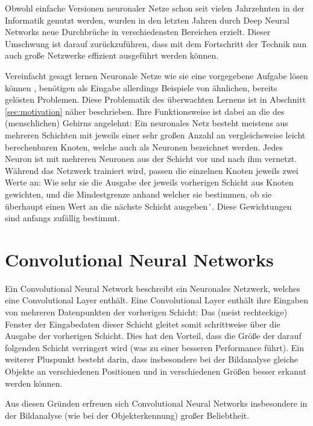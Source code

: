 Obwohl einfache Versionen neuronaler Netze schon seit vielen Jahrzehnten in der Informatik genutzt werden, wurden in den letzten Jahren durch Deep Neural Networks neue Durchbrüche in verschiedensten Bereichen erzielt. Dieser Umschwung ist darauf zurückzuführen, dass mit dem Fortschritt der Technik nun auch große Netzwerke effizient ausgeführt werden können.

Vereinfacht gesagt lernen Neuronale Netze wie sie eine vorgegebene Aufgabe lösen können \cite{hardesty_17}, benötigen als Eingabe allerdings Beispiele von ähnlichen, bereits gelösten Problemen. Diese Problematik des überwachten Lernens ist in Abschnitt \ref{sec:motivation} näher beschrieben. Ihre Funktionsweise ist dabei an die des (menschlichen) Gehirns angelehnt: Ein neuronales Netz besteht meistens aus mehreren Schichten mit jeweils einer sehr großen Anzahl an vergleichsweise leicht berechenbaren Knoten, welche auch als Neuronen bezeichnet werden. Jedes Neuron ist mit mehreren Neuronen aus der Schicht vor und nach ihm vernetzt.\cite{schmidhuber_15} Während das Netzwerk trainiert wird, passen die einzelnen Knoten jeweils zwei Werte an: Wie sehr sie die Ausgabe der jeweils vorherigen Schicht aus Knoten gewichten, und die Mindestgrenze anhand welcher sie bestimmen, ob sie überhaupt einen Wert an die nächste Schicht ausgeben´. Diese Gewichtungen sind anfangs zufällig bestimmt.\cite{hardesty_17, schmidhuber_15}

\section{Convolutional Neural Networks}
\label{sec:cnn}

Ein Convolutional Neural Network beschreibt ein Neuronales Netzwerk, welches eine Convolutional Layer enthält. Eine Convolutional Layer enthält ihre Eingaben von mehreren Datenpunkten der vorherigen Schicht: Das (meist rechteckige) Fenster der Eingabedaten dieser Schicht gleitet somit schrittweise über die Ausgabe der vorherigen Schicht. \cite{schmidhuber_15} Dies hat den Vorteil, dass die Größe der darauf folgenden Schicht verringert wird (was zu einer besseren Performance führt). Ein weiterer Pluspunkt besteht darin, dass insbesondere bei der Bildanalyse gleiche Objekte an verschiedenen Positionen und in verschiedenen Größen besser erkannt werden können. \cite{szegedy_15}

Aus diesen Gründen erfreuen sich Convolutional Neural Networks insbesondere in der Bildanalyse (wie \zB bei der Objekterkennung) großer Beliebtheit.
